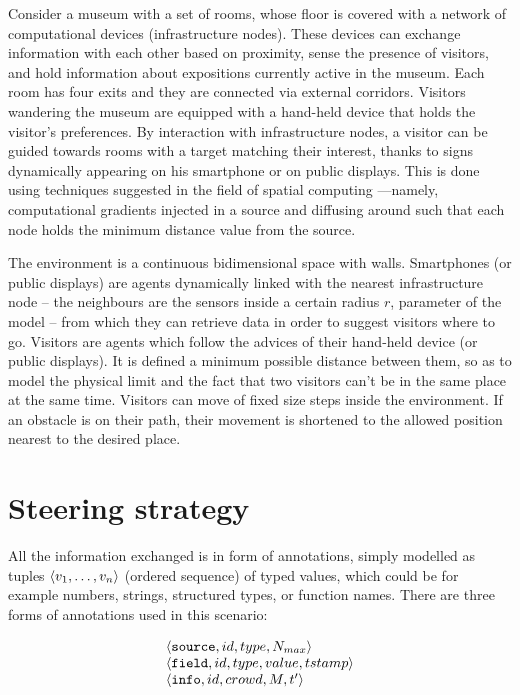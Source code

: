 \documentclass[12pt,a4paper,twoside,openright]{book}
\begin{document}
Consider a museum with a  set of rooms, whose floor is covered with a network of computational devices (infrastructure nodes).
%
These devices can exchange information with each other based on proximity, sense the presence of visitors, and hold information about expositions currently active in the museum.
%
Each room has four exits and they are connected via external corridors. Visitors wandering the museum are equipped with a hand-held device that holds the visitor's preferences.
%
By interaction with infrastructure nodes, a visitor can be guided towards rooms with a target matching their interest, thanks to signs dynamically appearing on his smartphone or on public displays.
%
This is done using techniques suggested in the field of spatial computing \cite{VCMZ-TAAS2011}---namely, computational gradients injected in a source and diffusing around such that each node holds the minimum distance value from the source.

The environment is a continuous bidimensional space with walls. 
%
Smartphones (or public displays) are agents dynamically linked with the nearest infrastructure node -- the neighbours are the sensors inside a certain radius $r$, parameter of the model -- from which they can retrieve data in order to suggest visitors where to go. Visitors are agents which follow the advices of their hand-held device (or public displays). It is defined a minimum possible distance between them, so as to model the physical limit and the fact that two visitors can't be in the same place at the same time. Visitors can move of fixed size steps inside the environment. If an obstacle is on their path, their movement is shortened to the allowed position nearest to the desired place.

\section{Steering strategy}

All the information exchanged is in form of annotations, simply modelled as tuples $\langle v_1,\ldots,v_n\rangle$ (ordered sequence) of typed values, which could be for example numbers, strings, structured types, or function names.
%
\noindent There are three forms of annotations used in this scenario:

{\[\begin{array}{l}
 \langle \mathtt{source}, id, type, N_{max}\rangle \\
 \langle \mathtt{field}, id, type, value, tstamp\rangle \\
\langle \mathtt{info}, id, crowd, M, t'\rangle \\
\end{array}\]}
\end{document}

